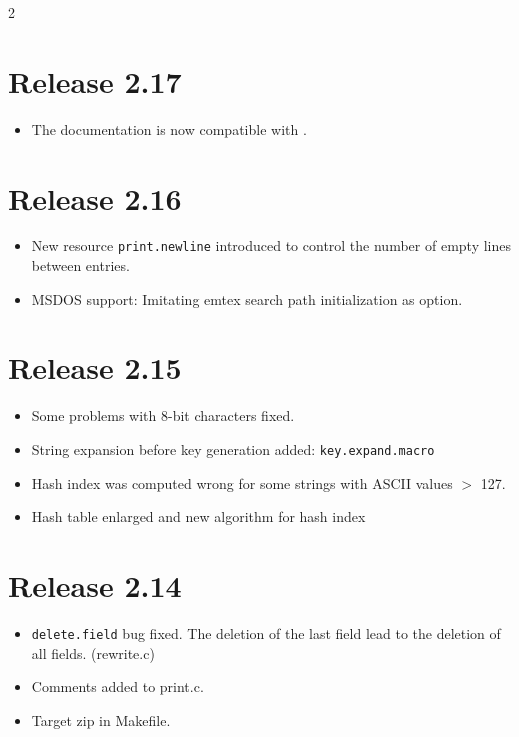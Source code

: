 \documentclass[11pt,a4paper]{scrartcl}
\newcommand\rsc[1]{\texttt{#1}}
\newcommand\File[1]{\textsf{#1}}
\newenvironment{Releases}{\begin{multicols}2\RaggedRight}{\end{multicols}}
\newenvironment{Release}[2]{%
  \def\tmp{#2}%
  \section*{Release #1 \ifx\tmp\empty\else{\normalsize[#2]}\fi}
  \begin{itemize}
}{\end{itemize}}
\newenvironment{Fix}[1]{\item }{}
\newenvironment{New}[1]{\item }{}
\newenvironment{Doc}[1]{\item }{}
\newenvironment{Update}[1]{\item }{}
\begin{document}
\begin{Releases}
 \begin{Release}{2.17}{}
  \begin{Doc}{gene}
    The documentation is now compatible with \LaTeXe.
  \end{Doc}
 \end{Release}

 \begin{Release}{2.16}{}
  \begin{New}{gene}
    New resource \rsc{print.newline} introduced to control the
    number of empty lines between entries.
  \end{New}
  \begin{New}{gene}
    MSDOS support: Imitating emtex search path initialization as
    option.
  \end{New}
 \end{Release}

 \begin{Release}{2.15}{}
  \begin{Fix}{gene}
    Some problems with 8-bit characters fixed.
  \end{Fix}
  \begin{New}{gene}
    String expansion before key generation added:
    \rsc{key.expand.macro}
  \end{New}
  \begin{Fix}{gene}
    Hash index was computed wrong for some strings with ASCII values $>$
    127.
  \end{Fix}
  \begin{Update}{gene}
    Hash table enlarged and new algorithm for hash index
  \end{Update}
 \end{Release}

 \begin{Release}{2.14}{}
  \begin{Fix}{gene}
    \rsc{delete.field} bug fixed. The deletion of the last
    field lead to the deletion of all fields. (\File{rewrite.c})
  \end{Fix}
  \begin{Update}{gene}
    Comments added to \File{print.c}.
  \end{Update}
  \begin{New}{gene}
    Target zip in \File{Makefile}.
  \end{New}
 \end{Release}


\end{Releases}
\end{document}
